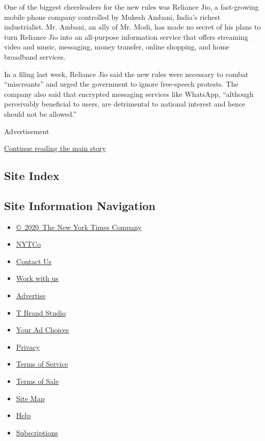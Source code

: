 One of the biggest cheerleaders for the new rules was Reliance Jio, a
fast-growing mobile phone company controlled by Mukesh Ambani, India's
richest industrialist. Mr. Ambani, an ally of Mr. Modi, has made no
secret of his plans to turn Reliance Jio into an all-purpose information
service that offers streaming video and music, messaging, money
transfer, online shopping, and home broadband services.

In a filing last week, Reliance Jio said the new rules were necessary to
combat ``miscreants'' and urged the government to ignore free-speech
protests. The company also said that encrypted messaging services like
WhatsApp, ``although perceivably beneficial to users, are detrimental to
national interest and hence should not be allowed.''

Advertisement

\protect\hyperlink{after-bottom}{Continue reading the main story}

\hypertarget{site-index}{%
\subsection{Site Index}\label{site-index}}

\hypertarget{site-information-navigation}{%
\subsection{Site Information
Navigation}\label{site-information-navigation}}

\begin{itemize}
\tightlist
\item
  \href{https://help.nytimes.com/hc/en-us/articles/115014792127-Copyright-notice}{©~2020~The
  New York Times Company}
\end{itemize}

\begin{itemize}
\tightlist
\item
  \href{https://www.nytco.com/}{NYTCo}
\item
  \href{https://help.nytimes.com/hc/en-us/articles/115015385887-Contact-Us}{Contact
  Us}
\item
  \href{https://www.nytco.com/careers/}{Work with us}
\item
  \href{https://nytmediakit.com/}{Advertise}
\item
  \href{http://www.tbrandstudio.com/}{T Brand Studio}
\item
  \href{https://www.nytimes.com/privacy/cookie-policy\#how-do-i-manage-trackers}{Your
  Ad Choices}
\item
  \href{https://www.nytimes.com/privacy}{Privacy}
\item
  \href{https://help.nytimes.com/hc/en-us/articles/115014893428-Terms-of-service}{Terms
  of Service}
\item
  \href{https://help.nytimes.com/hc/en-us/articles/115014893968-Terms-of-sale}{Terms
  of Sale}
\item
  \href{https://spiderbites.nytimes.com}{Site Map}
\item
  \href{https://help.nytimes.com/hc/en-us}{Help}
\item
  \href{https://www.nytimes.com/subscription?campaignId=37WXW}{Subscriptions}
\end{itemize}
